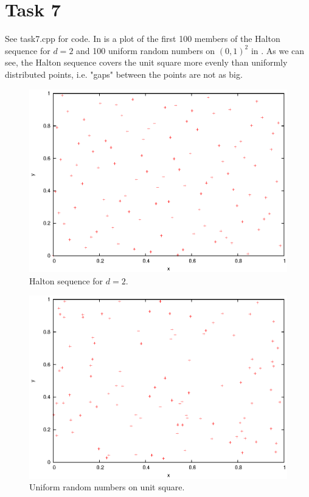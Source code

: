 \documentclass[]{article}
\begin{document}
\section*{Task 7} See task7.cpp for code. In  is a plot of the
first 100 members of the Halton sequence for $d=2$ and 100 uniform random numbers on
$(0,1)^2$ in . As we can see, the Halton sequence covers the
unit square more evenly than uniformly distributed points, i.e. "gaps" between the points are not as
big.
\begin{figure}[!ht]
\includegraphics[width=.9\textwidth]{task7_halton.eps}
\caption{Halton sequence for $d=2$.}
\label{fig:Task7a}
\end{figure}
\begin{figure}[!ht]
\includegraphics[width=.9\textwidth]{task7_uniform.eps}
\caption{Uniform random numbers on unit square.}
\label{fig:Task7b}
\end{figure}
\clearpage
\end{document}
